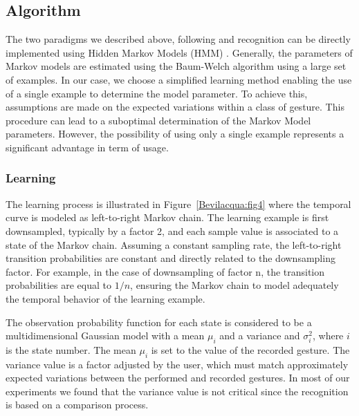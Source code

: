 \subsection{Algorithm}
The two paradigms we described above, following and recognition can be directly implemented using Hidden Markov Models (HMM) \cite{Rabiner:1989}. Generally, the parameters of Markov models are estimated using the Baum-Welch algorithm using a large set of examples. In our case, we choose a simplified learning method enabling the use of a single example to determine the model parameter. To achieve this, assumptions are made on the expected variations within a class of gesture. This procedure can lead to a suboptimal determination of the Markov Model parameters. However, the possibility of using only a single example represents a significant advantage in term of usage. 

\subsubsection{Learning}
The learning process is illustrated in Figure~\ref{Bevilacqua:fig4} where the temporal curve is modeled as left-to-right Markov chain. The learning example is first downsampled, typically by a factor 2, and each sample value is associated to a state of the Markov chain. Assuming a constant sampling rate, the left-to-right transition probabilities are constant and directly related to the downsampling factor. For example, in the case of downsampling of factor n, the transition probabilities are equal to $1/n$, ensuring the Markov chain to model adequately the temporal behavior of the learning example. 

The observation probability function for each state is considered to be a multidimensional Gaussian model with a mean $\mu_i$ and a variance and $\sigma_i^2$, where $i$ is the state number. The mean $\mu_i$ is set to the value of the recorded gesture. The variance value is a factor adjusted by the user, which must match approximately expected variations between the performed and recorded gestures. In most of our experiments we found that the variance value is not critical since the recognition is based on a comparison process. 

